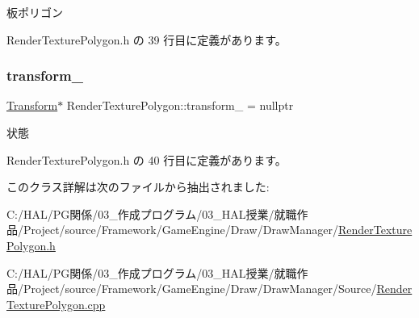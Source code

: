 板ポリゴン 



 Render\+Texture\+Polygon.\+h の 39 行目に定義があります。

\mbox{\label{class_render_texture_polygon_a6dab60101effeb8a36af342f53cd93e8}} 
\subsubsection{\texorpdfstring{transform\+\_\+}{transform\_}}
{\footnotesize\ttfamily \mbox{\hyperlink{class_transform}{Transform}}$\ast$ Render\+Texture\+Polygon\+::transform\+\_\+ = nullptr\hspace{0.3cm}{\ttfamily [private]}}



状態 



 Render\+Texture\+Polygon.\+h の 40 行目に定義があります。



このクラス詳解は次のファイルから抽出されました\+:\begin{DoxyCompactItemize}
\item 
C\+:/\+H\+A\+L/\+P\+G関係/03\+\_\+作成プログラム/03\+\_\+\+H\+A\+L授業/就職作品/\+Project/source/\+Framework/\+Game\+Engine/\+Draw/\+Draw\+Manager/\mbox{\hyperlink{_render_texture_polygon_8h}{Render\+Texture\+Polygon.\+h}}\item 
C\+:/\+H\+A\+L/\+P\+G関係/03\+\_\+作成プログラム/03\+\_\+\+H\+A\+L授業/就職作品/\+Project/source/\+Framework/\+Game\+Engine/\+Draw/\+Draw\+Manager/\+Source/\mbox{\hyperlink{_render_texture_polygon_8cpp}{Render\+Texture\+Polygon.\+cpp}}\end{DoxyCompactItemize}
